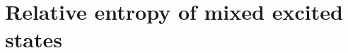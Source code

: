 \documentclass[11pt]{article}
\newcommand{\ep}{\epsilon}
\newcommand{\p}{\partial}
\newcommand{\lb}{\left(}
\newcommand{\rb}{\right)}
\begin{document}


\section{Relative entropy of mixed excited states}
\end{document}
